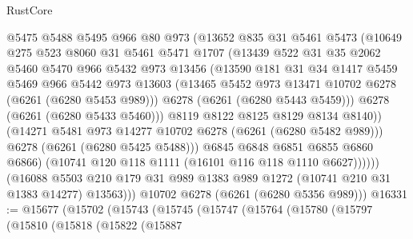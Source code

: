 \begin{lexlean}{RustCore}
\begin{coremodule}
                      @5475
                      @5488
                      @5495
                      @966
                      @80
                      @973
                      (@13652
                        @835
                        @31
                        @5461
                        @5473
                        (@10649
                          @275
                          @523
                          @8060
                          @31
                          @5461
                          @5471
                          @1707
                          (@13439
                            @522
                            @31
                            @35
                            @2062
                            @5460
                            @5470
                            @966
                            @5432
                            @973
                            @13456
                            (@13590
                              @181
                              @31
                              @34
                              @1417
                              @5459
                              @5469
                              @966
                              @5442
                              @973
                              @13603
                              (@13465 @5452 @973 @13471 @10702 @6278 (@6261 (@6280 @5453 @989)))
                              @6278
                              (@6261 (@6280 @5443 @5459)))
                            @6278
                            (@6261 (@6280 @5433 @5460)))
                          @8119
                          @8122
                          @8125
                          @8129
                          @8134
                          @8140))
                      (@14271 @5481 @973 @14277 @10702 @6278 (@6261 (@6280 @5482 @989)))
                      @6278
                      (@6261 (@6280 @5425 @5488)))
                    @6845
                    @6848
                    @6851
                    @6855
                    @6860
                    @6866)
                  (@10741 @120 @118 @1111 (@16101 @116 @118 @1110 @6627))))))
          (@16088 @5503 @210 @179 @31 @989 @1383 @989 @1272 (@10741 @210 @31 @1383 @14277) @13563)))
      @10702
      @6278
      (@6261 (@6280 @5356 @989)))
@16331 := @15677
    (@15702
      (@15743
        (@15745
          (@15747
            (@15764
              (@15780
                (@15797
                  (@15810
                    (@15818
                      (@15822
                        (@15887

\end{coremodule}
\end{lexlean}
